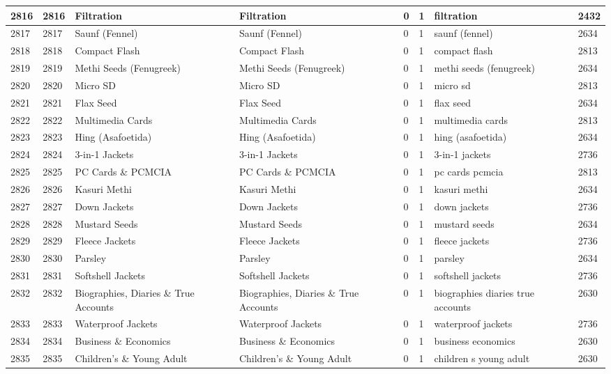 \begin{longtable}{|l|l|l|l|l|l|l|l|}
2816 & 2816 & Filtration & Filtration & 0 & 1 & filtration & 2432 \\ \hline 
2817 & 2817 & Saunf (Fennel) & Saunf (Fennel) & 0 & 1 & saunf (fennel) & 2634 \\ \hline 
2818 & 2818 & Compact Flash & Compact Flash & 0 & 1 & compact flash & 2813 \\ \hline 
2819 & 2819 & Methi Seeds (Fenugreek) & Methi Seeds (Fenugreek) & 0 & 1 & methi seeds (fenugreek) & 2634 \\ \hline 
2820 & 2820 & Micro SD & Micro SD & 0 & 1 & micro sd & 2813 \\ \hline 
2821 & 2821 & Flax Seed & Flax Seed & 0 & 1 & flax seed & 2634 \\ \hline 
2822 & 2822 & Multimedia Cards & Multimedia Cards & 0 & 1 & multimedia cards & 2813 \\ \hline 
2823 & 2823 & Hing (Asafoetida) & Hing (Asafoetida) & 0 & 1 & hing (asafoetida) & 2634 \\ \hline 
2824 & 2824 & 3-in-1 Jackets & 3-in-1 Jackets & 0 & 1 & 3-in-1 jackets & 2736 \\ \hline 
2825 & 2825 & PC Cards \& PCMCIA & PC Cards \& PCMCIA & 0 & 1 & pc cards pcmcia & 2813 \\ \hline 
2826 & 2826 & Kasuri Methi & Kasuri Methi & 0 & 1 & kasuri methi & 2634 \\ \hline 
2827 & 2827 & Down Jackets & Down Jackets & 0 & 1 & down jackets & 2736 \\ \hline 
2828 & 2828 & Mustard Seeds & Mustard Seeds & 0 & 1 & mustard seeds & 2634 \\ \hline 
2829 & 2829 & Fleece Jackets & Fleece Jackets & 0 & 1 & fleece jackets & 2736 \\ \hline 
2830 & 2830 & Parsley & Parsley & 0 & 1 & parsley & 2634 \\ \hline 
2831 & 2831 & Softshell Jackets & Softshell Jackets & 0 & 1 & softshell jackets & 2736 \\ \hline 
2832 & 2832 & Biographies, Diaries \& True Accounts & Biographies, Diaries \& True Accounts & 0 & 1 & biographies diaries true accounts & 2630 \\ \hline 
2833 & 2833 & Waterproof Jackets & Waterproof Jackets & 0 & 1 & waterproof jackets & 2736 \\ \hline 
2834 & 2834 & Business \& Economics & Business \& Economics & 0 & 1 & business economics & 2630 \\ \hline 
2835 & 2835 & Children's \& Young Adult & Children's \& Young Adult & 0 & 1 & children s young adult & 2630 \\ \hline 

\end{longtable}
